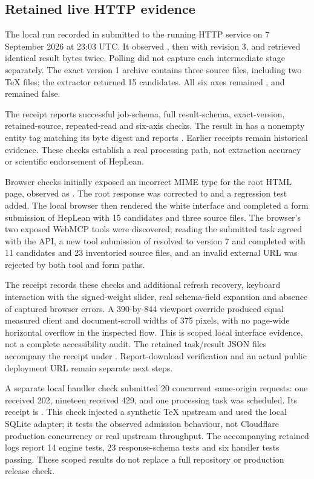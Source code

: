 \subsection{Retained live HTTP evidence}

The local run recorded in  submitted  to the running HTTP service on 7 September 2026 at 23:03 UTC. It observed , then  with revision 3, and retrieved identical result bytes twice. Polling did not capture each intermediate stage separately. The exact version 1 archive contains three source files, including two TeX files; the extractor returned 15 candidates. All six axes remained , and  remained false.

The receipt reports successful job-schema, full result-schema, exact-version, retained-source, repeated-read and six-axis checks. The result in  has a nonempty entity tag matching its byte digest and reports . Earlier receipts remain historical evidence. These checks establish a real processing path, not extraction accuracy or scientific endorsement of HepLean.

Browser checks initially exposed an incorrect MIME type for the root HTML page, observed as . The root response was corrected to  and a regression test added. The local browser then rendered the white interface and completed a form submission of HepLean with 15 candidates and three source files. The browser's two exposed WebMCP tools were discovered; reading the submitted task agreed with the API, a new tool submission of  resolved to version 7 and completed with 11 candidates and 23 inventoried source files, and an invalid external URL was rejected by both tool and form paths.

The receipt  records these checks and additional refresh recovery, keyboard interaction with the signed-weight slider, real schema-field expansion and absence of captured browser errors. A 390-by-844 viewport override produced equal measured client and document-scroll widths of 375 pixels, with no page-wide horizontal overflow in the inspected flow. This is scoped local interface evidence, not a complete accessibility audit. The retained task/result JSON files accompany the receipt under . Report-download verification and an actual public deployment URL remain separate next steps.

A separate local handler check submitted 20 concurrent same-origin requests: one received 202, nineteen received 429, and one processing task was scheduled. Its receipt is . This check injected a synthetic TeX upstream and used the local SQLite adapter; it tests the observed admission behaviour, not Cloudflare production concurrency or real upstream throughput. The accompanying retained logs report 14 engine tests, 23 response-schema tests and six handler tests passing. These scoped results do not replace a full repository or production release check.
